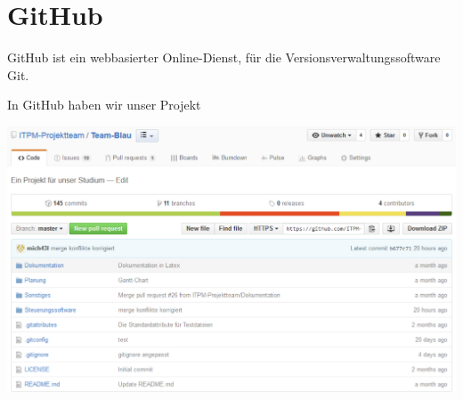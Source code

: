 \section{GitHub}
GitHub ist ein webbasierter Online-Dienst, für die Versionsverwaltungssoftware Git.

In GitHub haben wir unser Projekt 
\begin{center}
	\includegraphics[scale=0.5]{Bilder/Github.pdf}
\end{center}


